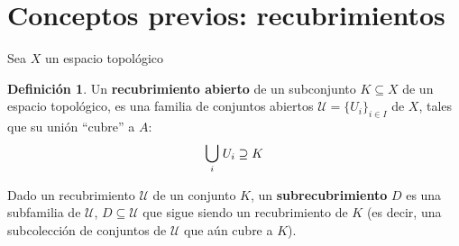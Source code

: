 \documentclass[12pt,twoside]{report}
\newcommand\mc[1]{\mathcal{#1}}
\theoremstyle{azul}
\theoremstyle{azul2}
\theoremstyle{plain}
\theoremstyle{definition}
\newtheorem*{defi}{Definición}
\theoremstyle{remark}
\begin{document}
\section{Conceptos previos: recubrimientos}
Sea $X$ un espacio topológico
\begin{defi}
Un \textbf{recubrimiento abierto} de un subconjunto $K \subseteq X$ de un espacio topológico, es una familia de conjuntos abiertos $\mc{U}=\{U_i\}_{i \in I}$ de $X$, tales que su unión ``cubre'' a $A$:
$$\mathlarger{\bigcup}_{i} \; U_i  \supseteq K$$

Dado un recubrimiento $\mc{U}$ de un conjunto $K$, un \textbf{subrecubrimiento} $D$ es una subfamilia de $\mc{U}$, $D \subseteq \mc{U}$ que sigue siendo un recubrimiento de $K$ (es decir, una subcolección de conjuntos de $\mc{U}$ que aún cubre a $K$).
\end{defi}
\end{document}
